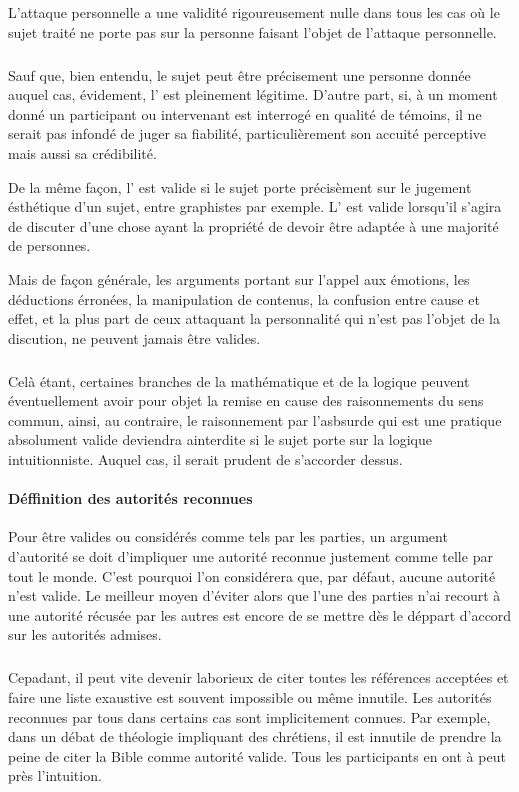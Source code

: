 L’attaque personnelle a une validité rigoureusement nulle dans tous les cas où le sujet traité ne porte pas sur la personne faisant l’objet de l’attaque personnelle.

\subparagraph{}
Sauf que, bien entendu, le sujet peut être précisement une personne donnée auquel cas, évidement, l’ est pleinement légitime. D’autre part, si, à un moment donné un participant ou intervenant est interrogé en qualité de témoins, il ne serait pas infondé de juger sa fiabilité, particulièrement son accuité perceptive mais aussi sa crédibilité.

De la même façon, l’ est valide si le sujet porte précisèment sur le jugement ésthétique d’un sujet, entre graphistes par exemple. L’ est valide lorsqu’il s’agira de discuter d’une chose ayant la propriété de devoir être adaptée à une majorité de personnes.

Mais de façon générale, les arguments portant sur l’appel aux émotions, les déductions érronées, la manipulation de contenus, la confusion entre cause et effet, et la plus part de ceux attaquant la personnalité qui n’est pas l’objet de la discution, ne peuvent jamais être valides.

\subparagraph{}
Celà étant, certaines branches de la mathématique et de la logique peuvent éventuellement avoir pour objet la remise en cause des raisonnements du sens commun, ainsi, au contraire, le raisonnement par l’asbsurde qui est une pratique absolument valide deviendra ainterdite si le sujet porte sur la logique intuitionniste. Auquel cas, il serait prudent de s’accorder dessus.

\paragraph{Déffinition des autorités reconnues} Pour être valides ou considérés comme tels par les parties, un argument d’autorité se doit d’impliquer une autorité reconnue justement comme telle par tout le monde. C’est pourquoi l’on considérera que, par défaut, aucune autorité n’est valide. Le meilleur moyen d’éviter alors que l’une des parties n’ai recourt à une autorité récusée par les autres est encore de se mettre dès le déppart d’accord sur les autorités admises.

\subparagraph{}
Cepadant, il peut vite devenir laborieux de citer toutes les références acceptées et faire une liste exaustive est souvent impossible ou même innutile. Les autorités reconnues par tous dans certains cas sont implicitement connues. Par exemple, dans un débat de théologie impliquant des chrétiens, il est innutile de prendre la peine de citer la Bible comme autorité valide. Tous les participants en ont à peut près l’intuition.

